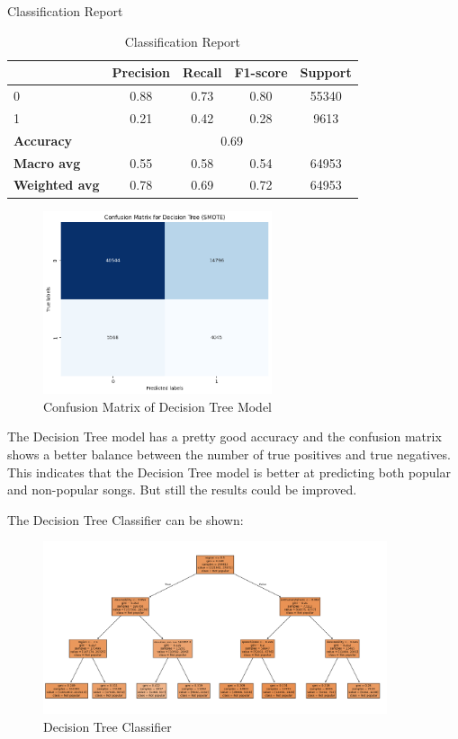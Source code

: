 Classification Report
\begin{table}[h]
    \centering
    \begin{tabular}{lcccc}
        \toprule
        & \textbf{Precision} & \textbf{Recall} & \textbf{F1-score} & \textbf{Support} \\
        \midrule
        0 & 0.88 & 0.73 & 0.80 & 55340 \\
        1 & 0.21 & 0.42 & 0.28 & 9613 \\
        \midrule
        \textbf{Accuracy} & \multicolumn{4}{c}{0.69} \\
        \textbf{Macro avg} & 0.55 & 0.58 & 0.54 & 64953 \\
        \textbf{Weighted avg} & 0.78 & 0.69 & 0.72 & 64953 \\
        \bottomrule
    \end{tabular}
    \caption{Classification Report}
    \label{tab:classification_report}
\end{table}
 
\begin{figure}[h] 
    \centering 
    \includegraphics[width=0.6\textwidth]{media/decision_tree_conf_matr.png}
    \caption{Confusion Matrix of Decision Tree Model}

\end{figure}

The Decision Tree model has a pretty good accuracy and the confusion matrix shows a better balance between the number of true positives and true negatives. This indicates that the Decision Tree model is better at predicting both popular and non-popular songs. But still the results could be improved.

\newpage
The Decision Tree Classifier can be shown:

\begin{figure}[H] 
    \centering 
    \includegraphics[width=0.9\textwidth]{media/decision_tree.png}
    \caption{Decision Tree Classifier}
    \label{fig:decision_tree}
\end{figure}




